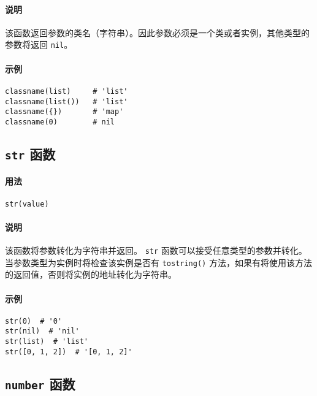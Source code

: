 \paragraph{说明}
该函数返回参数的类名（字符串）。因此参数必须是一个类或者实例，其他类型的参数将返回 \texttt{nil}。

\paragraph{示例}
\begin{lstlisting}[language=berry, numbers=none]
classname(list)     # 'list'
classname(list())   # 'list'
classname({})       # 'map'
classname(0)        # nil
\end{lstlisting}

\subsection{\texttt{str} 函数}

\paragraph{用法}
\begin{lstlisting}[language=berry, numbers=none]
str(value)
\end{lstlisting}

\paragraph{说明}
该函数将参数转化为字符串并返回。 \texttt{str} 函数可以接受任意类型的参数并转化。当参数类型为实例时将检查该实例是否有 \texttt{tostring()} 方法，如果有将使用该方法的返回值，否则将实例的地址转化为字符串。

\paragraph{示例}
\begin{lstlisting}[language=berry, numbers=none]
str(0)  # '0'
str(nil)  # 'nil'
str(list)  # 'list'
str([0, 1, 2])  # '[0, 1, 2]'
\end{lstlisting}

\subsection{\texttt{number} 函数}

